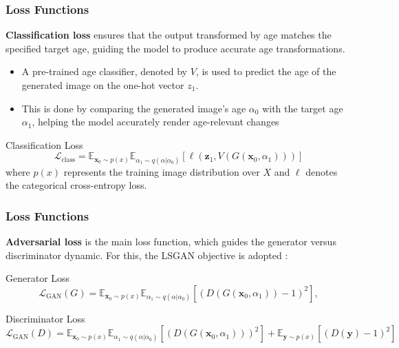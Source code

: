 \documentclass[aspectratio=169]{beamer}
\begin{document}
\begin{frame}
\frametitle{Loss Functions}

\textbf{Classification loss} ensures that the output transformed by age matches the specified target age, guiding the model to produce accurate age transformations. 

\begin{itemize}
    \item A pre-trained age classifier, denoted by $V$, is used to predict the age of the generated image on the one-hot vector $z_1$. 
    \item This is done by comparing the generated image's age $\alpha_0$ with the target age $\alpha_1$, helping the model accurately render age-relevant changes
\end{itemize}

\begin{block}{Classification Loss}
\begin{equation}
    \mathcal{L}_{\text{class}} = \mathbb{E}_{\mathbf{x}_0 \sim p(x)} \mathbb{E}_{\alpha_1 \sim q(\alpha | \alpha_0)} \left[ \ell(\mathbf{z}_1, V(G(\mathbf{x}_0, \alpha_1))) \right]
\end{equation}
where $p(x)$ represents the training image distribution over $X$ and $\ell$ denotes the categorical cross-entropy loss.
\end{block}

\end{frame}


\begin{frame}
\frametitle{Loss Functions}

\textbf{Adversarial loss} is the main loss function, which guides the generator versus discriminator dynamic. For this, the LSGAN objective is adopted \cite{LSGAN}:

\vspace{0.4cm}
\begin{block}{Generator Loss}
\begin{equation}
    \mathcal{L}_{\text{GAN}}(G) = \mathbb{E}_{\mathbf{x}_0 \sim p(x)} \mathbb{E}_{\alpha_1 \sim q(\alpha | \alpha_0)} \left[ \left( D(G(\mathbf{x}_0, \alpha_1)) - 1 \right)^2 \right],
\end{equation}
\end{block}

\vspace{0.4cm}
\begin{block}{Discriminator Loss}
\begin{equation}
    \mathcal{L}_{\text{GAN}}(D) = \mathbb{E}_{\mathbf{x}_0 \sim p(x)} \mathbb{E}_{\alpha_1 \sim q(\alpha | \alpha_0)} \left[ \left( D(G(\mathbf{x}_0, \alpha_1))\right)^2 \right] + \mathbb{E}_{\mathbf{y} \sim p(x)} \left[ \left( D(\mathbf{y}) -1 \right)^2 \right]
\end{equation}
\end{block}

\end{frame}
\end{document}
